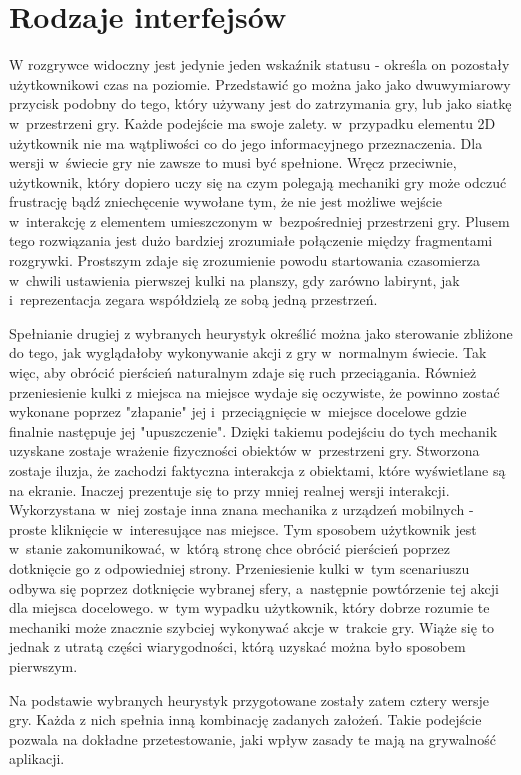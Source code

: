\documentclass[a4paper,12pt,numbers=noenddot]{report}
\begin{document}
\section{Rodzaje interfejsów}
W rozgrywce widoczny jest jedynie jeden wskaźnik statusu - określa on pozostały użytkownikowi czas na poziomie. Przedstawić go można jako jako dwuwymiarowy przycisk podobny do tego, który używany jest do zatrzymania gry, lub jako siatkę w~przestrzeni gry. Każde podejście ma swoje zalety. w~przypadku elementu 2D użytkownik nie ma wątpliwości co do jego informacyjnego przeznaczenia. Dla wersji w~świecie gry nie zawsze to musi być spełnione. Wręcz przeciwnie, użytkownik, który dopiero uczy się na czym polegają mechaniki gry może odczuć frustrację bądź zniechęcenie wywołane tym, że nie jest możliwe wejście w~interakcję z elementem umieszczonym w~bezpośredniej przestrzeni gry. Plusem tego rozwiązania jest dużo bardziej zrozumiałe połączenie między fragmentami rozgrywki. Prostszym zdaje się zrozumienie powodu startowania czasomierza w~chwili ustawienia pierwszej kulki na planszy, gdy zarówno labirynt, jak i~reprezentacja zegara współdzielą ze sobą jedną przestrzeń.

Spełnianie drugiej z wybranych heurystyk określić można jako sterowanie zbliżone do tego, jak wyglądałoby wykonywanie akcji z gry w~normalnym świecie. Tak więc, aby obrócić pierścień naturalnym zdaje się ruch przeciągania. Również przeniesienie kulki z miejsca na miejsce wydaje się oczywiste, że powinno zostać wykonane poprzez "złapanie" jej i~przeciągnięcie w~miejsce docelowe gdzie finalnie następuje jej "upuszczenie". Dzięki takiemu podejściu do tych mechanik uzyskane zostaje wrażenie fizyczności obiektów w~przestrzeni gry. Stworzona zostaje iluzja, że zachodzi faktyczna interakcja z obiektami, które wyświetlane są na ekranie. Inaczej prezentuje się to przy mniej realnej wersji interakcji. Wykorzystana w~niej zostaje inna znana mechanika z urządzeń mobilnych - proste kliknięcie w~interesujące nas miejsce. Tym sposobem użytkownik jest w~stanie zakomunikować, w~którą stronę chce obrócić pierścień poprzez dotknięcie go z odpowiedniej strony. Przeniesienie kulki w~tym scenariuszu odbywa się poprzez dotknięcie wybranej sfery, a~następnie powtórzenie tej akcji dla miejsca docelowego. w~tym wypadku użytkownik, który dobrze rozumie te mechaniki może znacznie szybciej wykonywać akcje w~trakcie gry. Wiąże się to jednak z utratą części wiarygodności, którą uzyskać można było sposobem pierwszym.

Na podstawie wybranych heurystyk przygotowane zostały zatem cztery wersje gry. Każda z nich spełnia inną kombinację zadanych założeń. Takie podejście pozwala na dokładne przetestowanie, jaki wpływ zasady te mają na grywalność aplikacji. 
\end{document}
